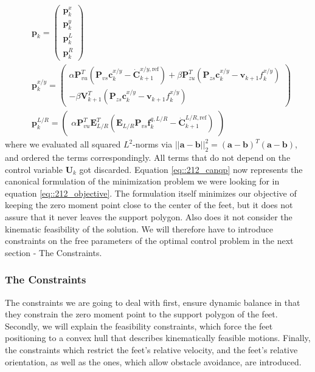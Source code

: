 \begin{align}
	&\bm{p}_k = \begin{pmatrix}
		\bm{p}_k^x \\
		\bm{p}_k^y \\
		\bm{p}_k^{L} \\
		\bm{p}_k^{R}
	\end{pmatrix} \\
	& \bm{p}_k^{x/y} = \begin{pmatrix}
		\alpha\bm{P}_{vu}^T(\bm{P}_{vs}\bm{c}_k^{x/y}-\dot{\bm{C}}_{k+1}^{x/y,\text{ref}}) + \beta\bm{P}_{zu}^T(\bm{P}_{zs}\bm{c}_k^{x/y}-\bm{v}_{k+1}f_k^{x/y})\\
		-\beta\bm{V}_{k+1}^T(\bm{P}_{zs}\bm{c}_k^{x/y}-\bm{v}_{k+1}f_k^{x/y})
	\end{pmatrix} \\
	& \bm{p}_k^{L/R} = \begin{pmatrix}
		\alpha\bm{P}_{vu}^T\bm{E}_{L/R}^T(\bm{E}_{L/R}\bm{P}_{vs}\bm{f}_k^{q,L/R}-\dot{\bm{C}}_{k+1}^{L/R,\text{ref}})
	\end{pmatrix}
\end{align}
where we evaluated all squared $L^2$-norms via $||\bm{a}-\bm{b}||^2_2 = (\bm{a}-\bm{b})^T(\bm{a}-\bm{b})$, and ordered the terms correspondingly. All terms that do not depend on the control variable $\bm{U}_k$ got discarded. Equation \ref{eq::212_canqp} now represents the canonical formulation of the minimization problem we were looking for in equation \ref{eq::212_objective}. The formulation itself minimizes our objective of keeping the zero moment point close to the center of the feet, but it does not assure that it never leaves the support polygon. Also does it not consider the kinematic feasibility of the solution. We will therefore have to introduce constraints on the free parameters of the optimal control problem in the next section - The Constraints.
\FloatBarrier
\subsubsection{The Constraints}
The constraints we are going to deal with first, ensure dynamic balance in that they constrain the zero moment point to the support polygon of the feet. Secondly, we will explain the feasibility constraints, which force the feet positioning to a convex hull that describes kinematically feasible motions. Finally, the constraints which restrict the feet's relative velocity, and the feet's relative orientation, as well as the ones, which allow obstacle avoidance, are introduced.
